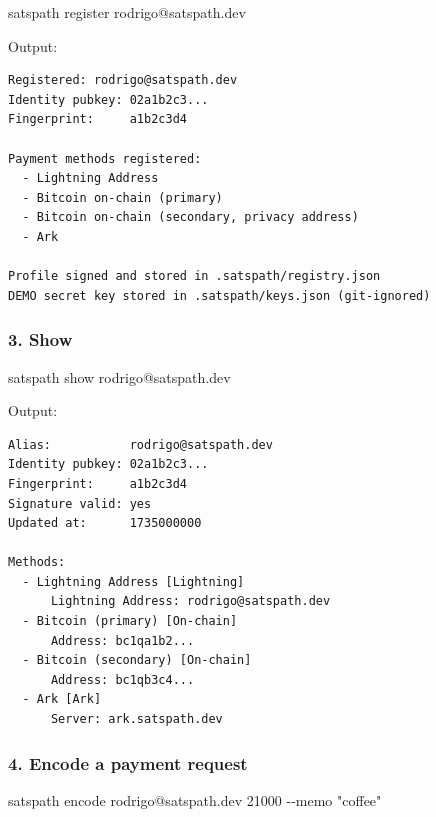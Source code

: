 \documentclass[
]{article}
\newenvironment{Shaded}{}{}
\newcommand{\AttributeTok}[1]{\textcolor[rgb]{0.49,0.56,0.16}{#1}}
\newcommand{\ExtensionTok}[1]{#1}
\newcommand{\NormalTok}[1]{#1}
\newcommand{\StringTok}[1]{\textcolor[rgb]{0.25,0.44,0.63}{#1}}
\begin{document}
\begin{Shaded}
\begin{Highlighting}[]
\ExtensionTok{satspath}\NormalTok{ register rodrigo@satspath.dev}
\end{Highlighting}
\end{Shaded}

Output:

\begin{verbatim}
Registered: rodrigo@satspath.dev
Identity pubkey: 02a1b2c3...
Fingerprint:     a1b2c3d4

Payment methods registered:
  - Lightning Address
  - Bitcoin on-chain (primary)
  - Bitcoin on-chain (secondary, privacy address)
  - Ark

Profile signed and stored in .satspath/registry.json
DEMO secret key stored in .satspath/keys.json (git-ignored)
\end{verbatim}

\hypertarget{show}{%
\subsubsection{3. Show}\label{show}}

\begin{Shaded}
\begin{Highlighting}[]
\ExtensionTok{satspath}\NormalTok{ show rodrigo@satspath.dev}
\end{Highlighting}
\end{Shaded}

Output:

\begin{verbatim}
Alias:           rodrigo@satspath.dev
Identity pubkey: 02a1b2c3...
Fingerprint:     a1b2c3d4
Signature valid: yes
Updated at:      1735000000

Methods:
  - Lightning Address [Lightning]
      Lightning Address: rodrigo@satspath.dev
  - Bitcoin (primary) [On-chain]
      Address: bc1qa1b2...
  - Bitcoin (secondary) [On-chain]
      Address: bc1qb3c4...
  - Ark [Ark]
      Server: ark.satspath.dev
\end{verbatim}

\hypertarget{encode-a-payment-request}{%
\subsubsection{4. Encode a payment
request}\label{encode-a-payment-request}}

\begin{Shaded}
\begin{Highlighting}[]
\ExtensionTok{satspath}\NormalTok{ encode rodrigo@satspath.dev 21000 }\AttributeTok{{-}{-}memo} \StringTok{"coffee"}
\end{Highlighting}
\end{Shaded}
\end{document}
